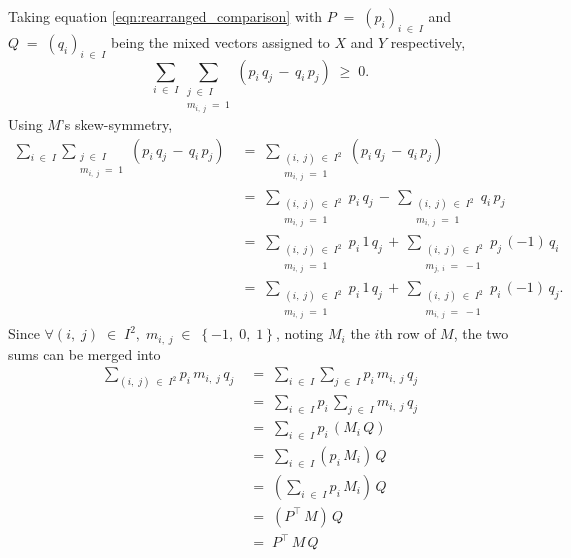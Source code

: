 \documentclass{report}
\theoremstyle{definition}
\theoremstyle{plain}
\begin{document}
Taking equation \ref{eqn:rearranged_comparison} with
$P\;=\;\left(p_i\right)_{i\;\in\;I}$ and $Q\;=\;\left(q_i\right)_{i\;\in\;I}$
being the mixed vectors assigned to $X$ and $Y$ respectively, \[
	\sum_{i\;\in\;I}
	\sum_{\substack{j\;\in\;I \\ m_{i,\;j}\;=\;1}}
	\left(p_i\,q_j\,-\,q_i\,p_j\right)
	\;\geqslant\;0.
\] Using $M$'s skew-symmetry,
\begin{align*}
	\sum_{i\;\in\;I}
	\sum_{\substack{j\;\in\;I \\ m_{i,\;j}\;=\;1}}
	\left(p_i\,q_j\,-\,q_i\,p_j\right)
	\;&=\;
	\sum_{\substack{\left(i,\;j\right)\;\in\;I^2 \\ m_{i,\;j}\;=\;1}}
	\left(p_i\,q_j\,-\,q_i\,p_j\right) \\
	&=\;
	\sum_{\substack{\left(i,\;j\right)\;\in\;I^2 \\ m_{i,\;j}\;=\;1}}
	p_i\,q_j
	\,-\,\sum_{\substack{\left(i,\;j\right)\;\in\;I^2 \\ m_{i,\;j}\;=\;1}}
	q_i\,p_j \\
	&=\;
	\sum_{\substack{\left(i,\;j\right)\;\in\;I^2 \\ m_{i,\;j}\;=\;1}}
	p_i\,1\,q_j
	\,+\,\sum_{\substack{\left(i,\;j\right)\;\in\;I^2 \\ m_{j,\;i}\;=\;-1}}
	p_j\,\left(-1\right)\,q_i \\
	&=\;
	\sum_{\substack{\left(i,\;j\right)\;\in\;I^2 \\ m_{i,\;j}\;=\;1}}
	p_i\,1\,q_j
	\,+\,\sum_{\substack{\left(i,\;j\right)\;\in\;I^2 \\ m_{i,\;j}\;=\;-1}}
	p_i\,\left(-1\right)\,q_j.
\end{align*}
Since $\forall\left(i,\;j\right)\;\in\;I^2,\;
m_{i,\;j}\;\in\;\left\{-1,\;0,\;1\right\}$, noting $M_i$ the $i$th row of $M$,
the two sums can be merged into
\begin{align*}
	\sum_{\left(i,\;j\right)\;\in\;I^2}p_i\,m_{i,\;j}\,q_j
	\;&=\;\sum_{i\;\in\;I}\sum_{j\;\in\;I}p_i\,m_{i,\;j}\,q_j \\
	&=\;\sum_{i\;\in\;I}p_i\,\sum_{j\;\in\;I}m_{i,\;j}\,q_j \\
	&=\;\sum_{i\;\in\;I}p_i\,\left(M_i\,Q\right) \\
	&=\;\sum_{i\;\in\;I}\left(p_i\,M_i\right)\,Q \\
	&=\;\left(\sum_{i\;\in\;I}p_i\,M_i\right)\,Q \\
	&=\;\left(P^\top\,M\right)\,Q \\
	&=\;P^\top\,M\,Q \\
\end{align*}
\end{document}
